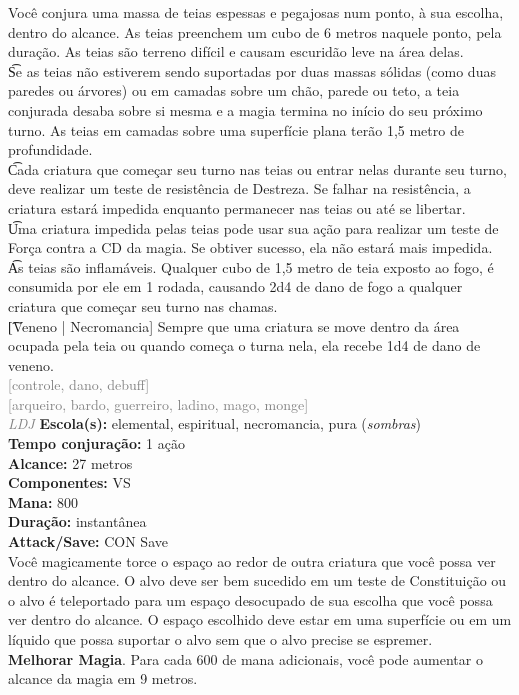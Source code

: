 \documentclass{RPG_Adventure}[2021/10/20]
\begin{document}
{\normalsize Você conjura uma massa de teias espessas e pegajosas num ponto, à sua escolha, dentro do alcance. As teias preenchem um cubo de 6 metros naquele ponto, pela duração. As teias são terreno difícil e causam escuridão leve na área delas.\\\t Se as teias não estiverem sendo suportadas por duas massas sólidas (como duas paredes ou árvores) ou em camadas sobre um chão, parede ou teto, a teia conjurada desaba sobre si mesma e a magia termina no início do seu próximo turno. As teias em camadas sobre uma superfície plana terão 1,5 metro de profundidade.\\\t Cada criatura que começar seu turno nas teias ou entrar nelas durante seu turno, deve realizar um teste de resistência de Destreza. Se falhar na resistência, a criatura estará impedida enquanto permanecer nas teias ou até se libertar.\\\t Uma criatura impedida pelas teias pode usar sua ação para realizar um teste de Força contra a CD da magia. Se obtiver sucesso, ela não estará mais impedida.\\\t As teias são inflamáveis. Qualquer cubo de 1,5 metro de teia exposto ao fogo, é consumida por ele em 1 rodada, causando 2d4 de dano de fogo a qualquer criatura que começar seu turno nas chamas.\\\t [Veneno | Necromancia] Sempre que uma criatura se move dentro da área ocupada pela teia ou quando começa o turna nela, ela recebe 1d4 de dano de veneno.\\}
{\scriptsize \textcolor{gray}{[controle, dano, debuff]\\}}
{\scriptsize \textcolor{gray}{[arqueiro, bardo, guerreiro, ladino, mago, monge]\\}}
{\tiny \textcolor{gray}{\textit{LDJ}}}\jump{}
{\small \t \textbf{Escola(s):} elemental, espiritual, necromancia, pura (\textit{sombras})\\\t \textbf{Tempo conjuração:} 1 ação\\\t \textbf{Alcance:} 27 metros\\\t \textbf{Componentes:} VS\\\t \textbf{Mana:} 800\\\t \textbf{Duração:} instantânea\\\t \textbf{Attack/Save:} CON Save\\}
{\normalsize Você magicamente torce o espaço ao redor de outra criatura que você possa ver dentro do alcance. O alvo deve ser bem sucedido em um teste de Constituição ou o alvo é teleportado para um espaço desocupado de sua escolha que você possa ver dentro do alcance. O espaço escolhido deve estar em uma superfície ou em um líquido que possa suportar o alvo sem que o alvo precise se espremer.\\\t \textbf{Melhorar Magia}. Para cada 600 de mana adicionais, você pode aumentar o alcance da magia em 9 metros.\\}
\end{document}

